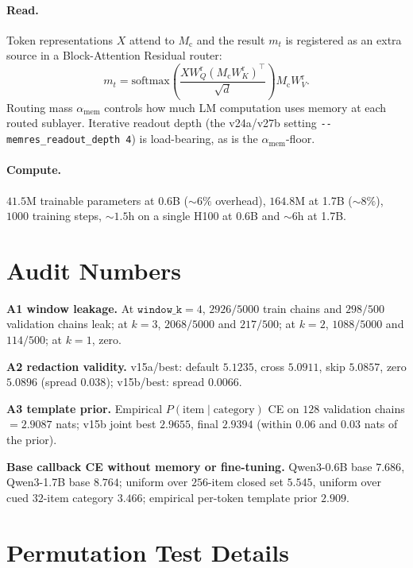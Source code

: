 \documentclass{article}
\newcommand{\Mc}{M_{\mathrm{c}}}
\newcommand{\mt}{m_t}
\newcommand{\amem}{\alpha_{\mathrm{mem}}}
\begin{document}
\paragraph{Read.}  Token representations $X$ attend to $\Mc$ and the
result $\mt$ is registered as an extra source in a Block-Attention
Residual router:
\begin{equation}
\mt = \mathrm{softmax}\!\left(\frac{XW_Q^{\mathrm{r}}(\Mc W_K^{\mathrm{r}})^\top}{\sqrt d}\right)\Mc W_V^{\mathrm{r}} .
\end{equation}
Routing mass $\amem$ controls how much LM computation uses memory at
each routed sublayer.  Iterative readout depth (the v24a/v27b setting
\verb|--memres_readout_depth 4|) is load-bearing, as is the
$\amem$-floor.

\paragraph{Compute.}  $41.5$M trainable parameters at 0.6B
($\sim\!6\%$ overhead), $164.8$M at 1.7B ($\sim\!8\%$), $1000$
training steps, $\sim\!1.5$h on a single H100 at 0.6B and
$\sim\!6$h at 1.7B.

\section{Audit Numbers}
\label{app:audits}

\textbf{A1 window leakage.}  At $\texttt{window\_k}=4$,
$2926/5000$ train chains and $298/500$ validation chains leak; at
$k=3$, $2068/5000$ and $217/500$; at $k=2$, $1088/5000$ and
$114/500$; at $k=1$, zero.

\textbf{A2 redaction validity.}  v15a/best: default $5.1235$,
cross $5.0911$, skip $5.0857$, zero $5.0896$ (spread $0.038$);
v15b/best: spread $0.0066$.

\textbf{A3 template prior.}  Empirical
$P(\text{item}\mid\text{category})$ CE on $128$ validation chains
$=2.9087$ nats; v15b joint best $2.9655$, final $2.9394$ (within
$0.06$ and $0.03$ nats of the prior).

\textbf{Base callback CE without memory or fine-tuning.}
Qwen3-0.6B base $7.686$, Qwen3-1.7B base $8.764$; uniform over
$256$-item closed set $5.545$, uniform over cued $32$-item category
$3.466$; empirical per-token template prior $2.909$.

\section{Permutation Test Details}
\label{app:perm}
\end{document}
